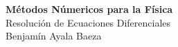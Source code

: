 \documentclass[twoside]{article}
\begin{document}
\thispagestyle{plainfirst}

\begin{tcolorbox}[portada]
    \centering
    {\Huge \bfseries Métodos Númericos para la Física}\\[0.5cm]
    {\LARGE Resolución de Ecuaciones Diferenciales}\\[0.5cm]
    {\large Benjamín Ayala Baeza}
\end{tcolorbox}
\end{document}
